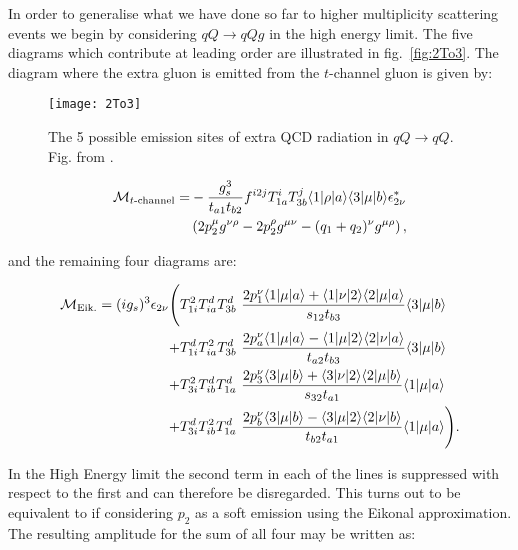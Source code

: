 	In order to generalise what we have done so far to higher multiplicity scattering events we begin
	by considering $qQ\rightarrow qQg$ in the high energy limit.  The five diagrams which contribute at
	leading order are illustrated in fig.~\eqref{fig:2To3}.  The diagram
	where the extra gluon is emitted from the $t$-channel gluon is given by:

	\begin{figure}[t]
		\begin{center}
		\texttt{[image: 2To3]}
		\caption{The 5 possible emission sites of extra QCD radiation in $qQ\rightarrow qQ$.
		Fig. from \cite{Andersen:2009nu}.}
		\label{fig:2To3}
		\end{center}
	\end{figure}

	\begin{align}
	\begin{split}
		\mathcal{M}_{t\text{-channel}} = &-\frac{g_s^3}{t_{a1}t_{b2}}f^{i2j}T^i_{1a}T^j_{3b}\langle 1 | \rho | a \rangle\langle 3 | \mu | b \rangle
		\epsilon^*_{2\nu}\\&\left(2p_2^\mu g^{\nu\rho} - 2p_2^\rho g^{\mu\nu} - (q_1 + q_2)^\nu g^{\mu\rho} \right),
		\label{eqn:mtchannel}
	\end{split}
	\end{align}

	and the remaining four diagrams are:

	\begin{align}
	\begin{split}
	    \mathcal{M}_{\text{Eik.}} = (ig_s)^3 \epsilon_{2\nu} \Bigg(
	     &T^2_{1i}T^d_{ia}T^d_{3b}\ \frac{2p_1^\nu\langle 1 | \mu | a \rangle + \langle 1 | \nu | 2 \rangle\langle 2 | \mu | a \rangle} {s_{12}t_{b3}} \langle 3 | \mu | b \rangle \\
	    +&T^d_{1i}T^2_{ia}T^d_{3b}\ \frac{2p_a^\nu\langle 1 | \mu | a \rangle - \langle 1 | \mu | 2 \rangle\langle 2 | \nu | a \rangle} {t_{a2}t_{b3}} \langle 3 | \mu | b \rangle \\
	    +&T^2_{3i}T^d_{ib}T^d_{1a}\ \frac{2p_3^\nu\langle 3 | \mu | b \rangle + \langle 3 | \nu | 2 \rangle\langle 2 | \mu | b \rangle} {s_{32}t_{a1}} \langle 1 | \mu | a \rangle\\
	    +&T^d_{3i}T^2_{ib}T^d_{1a}\ \frac{2p_b^\nu\langle 3 | \mu | b \rangle - \langle 3 | \mu | 2 \rangle\langle 2 | \nu | b \rangle} {t_{b2}t_{a1}} \langle 1 | \mu | a \rangle\Bigg).
		\label{eq:fulltree}
	\end{split}
	\end{align}

	In the High Energy limit the second term in each of the lines is suppressed with respect to the
	first and can therefore be disregarded.  This turns out to be equivalent to if considering
	$p_2$ as a soft emission using the Eikonal approximation.  The resulting amplitude for the sum
	of all four may be written as:

